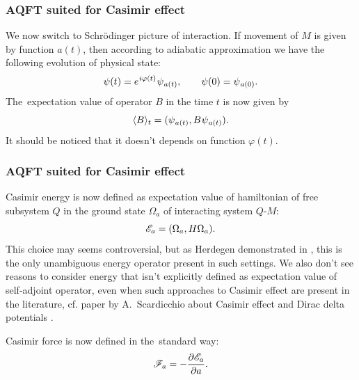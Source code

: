 \documentclass[10pt,t]{beamer}
\begin{document}
\begin{frame}
  \frametitle{AQFT suited for Casimir effect}


  We now switch to Schr\"{o}dinger picture of interaction. If movement of
  $M$ is given by function $a( t )$, then according to adiabatic
  approximation we have the following evolution of physical state:
  \begin{equation}
    \label{eq:Overview-of-Herdegens-approach-ETC-04}
    \psi( t ) =
    e^{ \hspace{0.05em} i \varphi( t ) } \hspace{0.05em} \psi_{ \hspace{0.05em} a( t ) }, \qquad
    \psi( 0 ) = \psi_{ \hspace{0.05em} a( 0 ) }.
  \end{equation}
  The~expectation value of operator $B$ in the time $t$ is now given by
  \begin{equation}
    \label{eq:Overview-of-Herdegens-approach-ETC-05}
    \langle B \rangle_{ t } =
    ( \psi_{ \hspace{0.05em} a( t ) }, B \hspace{0.05em} \psi_{ \hspace{0.05em} a( t ) } ).
  \end{equation}
  It should be noticed that it doesn't depends on function $\varphi( t )$.

\end{frame}





\begin{frame}
  \frametitle{AQFT suited for Casimir effect}


  Casimir energy is now defined as expectation value of  hamiltonian of
  \alert{free} subsystem $Q$ in the ground state $\Omega_{ a }$ of interacting
  system $Q\text{-}M$:
  \begin{equation}
    \label{eq:Overview-of-Herdegens-approach-ETC-06}
    \mathcal{E}_{ a } = ( \Omega_{ a }, H \Omega_{ a } ).
  \end{equation}
  This choice may seems controversial, but as Herdegen demonstrated in
  \parencite{Herdegen-Quantum-backreaction-ETC-Part-I-Pub-2005}, this is
  the only unambiguous energy operator present in such settings. We also
  don't see reasons to consider energy that isn't explicitly defined as
  expectation value of self-adjoint operator, even when such approaches to
  Casimir effect are present in the literature, cf. paper by A.~Scardicchio
  about Casimir effect and Dirac delta potentials
  \parencite{Scardicchio-Casimir-dynamics-ETC-2005}.

  Casimir force is now defined in the~standard way:
  \begin{equation}
    \label{eq:Overview-of-Herdegens-approach-ETC-07}
    \mathcal{F}_{ a } = -\frac{ \partial \mathcal{E}_{ a } }{ \partial a }.
  \end{equation}

\end{frame}
\end{document}
